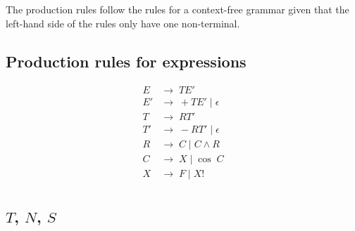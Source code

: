 \documentclass[a4paper, 12pt, oneside]{book}
\begin{document}
The production rules follow the rules for a context-free grammar given that the left-hand side of the rules only have one non-terminal.

\subsection{Production rules for expressions}

\begin{align*}
  E  & \rightarrow \; TE'                   \\
  E' & \rightarrow \; +TE' \; | \; \epsilon \\
  T  & \rightarrow \; RT'                   \\
  T' & \rightarrow \; -RT' \; | \; \epsilon \\
  R  & \rightarrow \; C \; | \; C \wedge R  \\
  C  & \rightarrow \; X \; | \; \cos \; C   \\
  X  & \rightarrow \; F \; | \; X!          \\
\end{align*}

\subsection{$T$, $N$, $S$}
\end{document}
